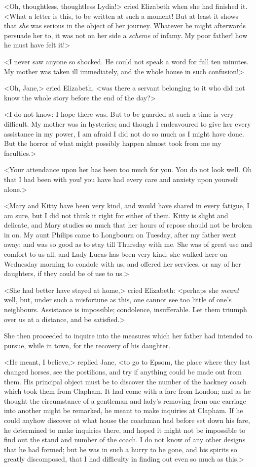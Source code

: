 <Oh, thoughtless, thoughtless Lydia!> cried Elizabeth when she had finished it. <What a letter is this, to be written at such a moment! But at least it shows that \textit{she} was serious in the object of her journey. Whatever he might afterwards persuade her to, it was not on her side a \textit{scheme} of infamy. My poor father! how he must have felt it!>

<I never saw anyone so shocked. He could not speak a word for full ten minutes. My mother was taken ill immediately, and the whole house in such confusion!>

<Oh, Jane,> cried Elizabeth, <was there a servant belonging to it who did not know the whole story before the end of the day?>

<I do not know: I hope there was. But to be guarded at such a time is very difficult. My mother was in hysterics; and though I endeavoured to give her every assistance in my power, I am afraid I did not do so much as I might have done. But the horror of what might possibly happen almost took from me my faculties.>

<Your attendance upon her has been too much for you. You do not look well. Oh that I had been with you! you have had every care and anxiety upon yourself alone.>

<Mary and Kitty have been very kind, and would have shared in every fatigue, I am sure, but I did not think it right for either of them. Kitty is slight and delicate, and Mary studies so much that her hours of repose should not be broken in on. My aunt Philips came to Longbourn on Tuesday, after my father went away; and was so good as to stay till Thursday with me. She was of great use and comfort to us all, and Lady Lucas has been very kind: she walked here on Wednesday morning to condole with us, and offered her services, or any of her daughters, if they could be of use to us.>

<She had better have stayed at home,> cried Elizabeth: <perhaps she \textit{meant} well, but, under such a misfortune as this, one cannot see too little of one's neighbours. Assistance is impossible; condolence, insufferable. Let them triumph over us at a distance, and be satisfied.>

She then proceeded to inquire into the measures which her father had intended to pursue, while in town, for the recovery of his daughter.

<He meant, I believe,> replied Jane, <to go to Epsom, the place where they last changed horses, see the postilions, and try if anything could be made out from them. His principal object must be to discover the number of the hackney coach which took them from Clapham. It had come with a fare from London; and as he thought the circumstance of a gentleman and lady's removing from one carriage into another might be remarked, he meant to make inquiries at Clapham. If he could anyhow discover at what house the coachman had before set down his fare, he determined to make inquiries there, and hoped it might not be impossible to find out the stand and number of the coach. I do not know of any other designs that he had formed; but he was in such a hurry to be gone, and his spirits so greatly discomposed, that I had difficulty in finding out even so much as this.>